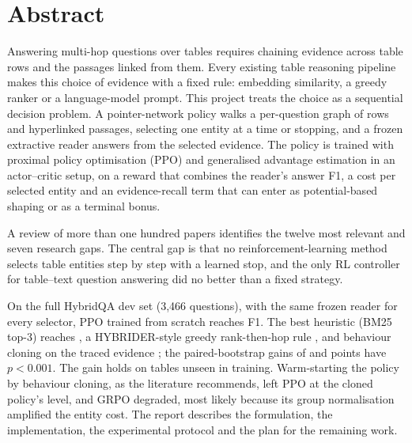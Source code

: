 \chapter*{Abstract}

Answering multi-hop questions over tables requires chaining evidence across table rows and the passages linked from them. Every existing table reasoning pipeline makes this choice of evidence with a fixed rule: embedding similarity, a greedy ranker or a language-model prompt. This project treats the choice as a sequential decision problem. A pointer-network policy walks a per-question graph of rows and hyperlinked passages, selecting one entity at a time or stopping, and a frozen extractive reader answers from the selected evidence. The policy is trained with proximal policy optimisation (PPO) and generalised advantage estimation in an actor--critic setup, on a reward that combines the reader's answer F1, a cost per selected entity and an evidence-recall term that can enter as potential-based shaping or as a terminal bonus.

A review of more than one hundred papers identifies the twelve most relevant and seven research gaps. The central gap is that no reinforcement-learning method selects table entities step by step with a learned stop, and the only RL controller for table--text question answering did no better than a fixed strategy.

On the full HybridQA dev set (3{,}466 questions), with the same frozen reader for every selector, PPO trained from scratch reaches \fScratch{} F1. The best heuristic (BM25 top-3) reaches \fBmThree{}, a HYBRIDER-style greedy rank-then-hop rule \fGreedy{}, and behaviour cloning on the traced evidence \fBc{}; the paired-bootstrap gains of \dScratchBm{} and \dScratchBc{} points have $p<0.001$. The gain holds on tables unseen in training.  Warm-starting the policy by behaviour cloning, as the literature recommends, left PPO at the cloned policy's level, and GRPO degraded, most likely because its group normalisation amplified the entity cost. The report describes the formulation, the implementation, the experimental protocol and the plan for the remaining work.
